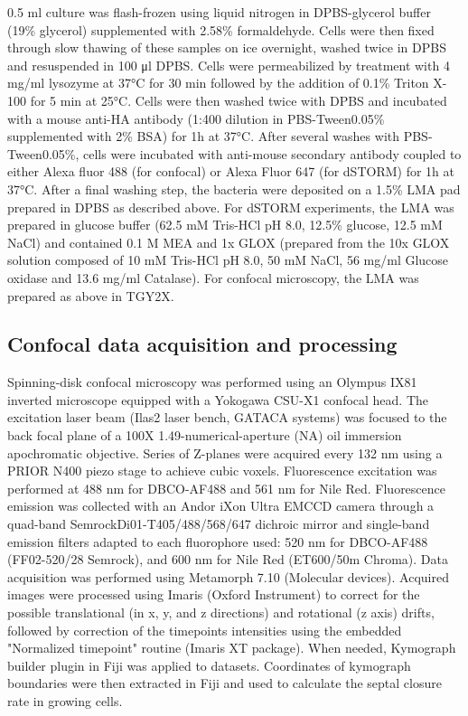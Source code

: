 0.5 ml culture was flash-frozen using liquid nitrogen in DPBS-glycerol buffer (19\% glycerol) supplemented with 2.58\% formaldehyde.
Cells were then fixed through slow thawing of these samples on ice overnight, washed twice in DPBS and resuspended in 100 μl DPBS.
Cells were permeabilized by treatment with 4 mg/ml lysozyme at 37°C for 30 min followed by the addition of 0.1\% Triton X-100 for 5 min at 25°C.
Cells were then washed twice with DPBS and incubated with a mouse anti-HA antibody (1:400 dilution in PBS-Tween0.05\% supplemented with 2\% BSA) for 1h at 37°C.
After several washes with PBS-Tween0.05\%, cells were incubated with anti-mouse secondary antibody coupled to either Alexa fluor 488 (for confocal) or Alexa Fluor 647 (for dSTORM) for 1h at 37°C.
After a final washing step, the bacteria were deposited on a 1.5\% LMA pad prepared in DPBS as described above.
For dSTORM experiments, the LMA was prepared in glucose buffer (62.5 mM Tris-HCl pH 8.0, 12.5\% glucose, 12.5 mM NaCl) and contained 0.1 M MEA and 1x GLOX (prepared from the 10x GLOX solution composed of 10 mM Tris-HCl pH 8.0, 50 mM NaCl, 56 mg/ml Glucose oxidase and 13.6 mg/ml Catalase).
For confocal microscopy, the LMA was prepared as above in TGY2X.

\subsection{Confocal data acquisition and processing}

Spinning-disk confocal microscopy was performed using an Olympus IX81 inverted microscope equipped with a Yokogawa CSU-X1 confocal head.
The excitation laser beam (Ilas2 laser bench, GATACA systems) was focused to the back focal plane of a 100X 1.49-numerical-aperture (NA) oil immersion apochromatic objective.
Series of Z-planes were acquired every 132 nm using a PRIOR N400 piezo stage to achieve cubic voxels.
Fluorescence excitation was performed at 488 nm for DBCO-AF488 and 561 nm for Nile Red.
Fluorescence emission was collected with an Andor iXon Ultra EMCCD camera through a quad-band Semrock\texttrademark Di01-T405/488/568/647 dichroic mirror and single-band emission filters adapted to each fluorophore used: 520 nm for DBCO-AF488 (FF02-520/28 Semrock\texttrademark), and 600 nm for Nile Red (ET600/50m Chroma\texttrademark).
Data acquisition was performed using Metamorph 7.10 (Molecular devices).
Acquired images were processed using Imaris (Oxford Instrument\texttrademark) to correct for the possible translational (in x, y, and z directions) and rotational (z axis) drifts, followed by correction of the timepoints intensities using the embedded "Normalized timepoint" routine (Imaris XT package).
When needed, Kymograph builder plugin in Fiji was applied to datasets.
Coordinates of kymograph boundaries were then extracted in Fiji and used to calculate the septal closure rate in growing cells.

